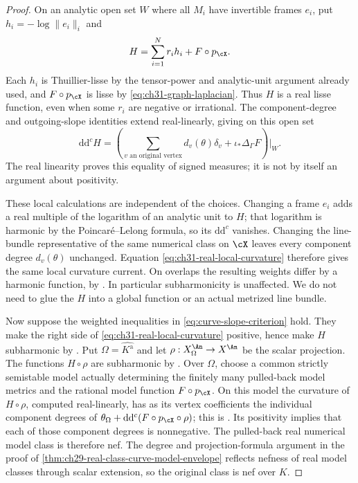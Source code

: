 \begin{proof}
On an analytic open set \(W\) where all \(M_i\) have invertible frames \(e_i\),
put \(h_i=-\log\lVert e_i\rVert_i\) and
\[
                  H=\sum_{i=1}^N r_i h_i+F\circ p_{\cX}.
\]
Each \(h_i\) is Thuillier-lisse by the tensor-power and analytic-unit
argument already used, and \(F\circ p_{\cX}\) is lisse by
\eqref{eq:ch31-graph-laplacian}.  Thus \(H\) is a real lisse function,
even when some \(r_i\) are negative or irrational.
The component-degree and outgoing-slope identities extend
real-linearly, giving on this open set
\begin{equation}
\label{eq:ch31-real-local-curvature}
 \mathrm d\mathrm d^cH
  =\left(\sum_{v\text{ an original vertex}}
                 d_v(\theta)\delta_v
                       +\iota_*\Delta_\Gamma F\right)\bigg|_W.
\end{equation}
The real linearity proves this equality of signed measures;
it is not by itself an argument about positivity.

These local calculations are independent of the choices.
Changing a frame \(e_i\) adds a real multiple of the logarithm
of an analytic unit to \(H\); that logarithm is harmonic by the
Poincar\'e--Lelong formula, so its
\(\mathrm d\mathrm d^c\) vanishes.
Changing the line-bundle representative of the same numerical class
on \(\cX\) leaves every component degree \(d_v(\theta)\) unchanged.
Equation \eqref{eq:ch31-real-local-curvature} therefore gives the
same local curvature current.  On overlaps the resulting weights
differ by a harmonic function, by \cite[Lemma~3.3.12]{Thu05}.
In particular subharmonicity is unaffected.  We do not need to
glue the \(H\) into a global function or an actual metrized line bundle.

Now suppose the weighted inequalities in
\eqref{eq:curve-slope-criterion} hold.  They make the right side of
\eqref{eq:ch31-real-local-curvature} positive, hence make \(H\)
subharmonic by \cite[Theorem~3.4.12(ii)]{Thu05}.
Put \(\Omega=\widehat{K^{\mathrm a}}\) and let
\(\rho:X_\Omega^{\An}\to X^{\An}\) be the scalar projection.
The functions \(H\circ\rho\) are subharmonic by
\cite[Corollary~3.4.5]{Thu05}.
Over \(\Omega\), choose a common strictly semistable model actually
determining the finitely many pulled-back model metrics and the
rational model function \(F\circ p_{\cX}\).
On this model the curvature of \(H\circ\rho\), computed real-linearly,
has as its vertex coefficients the individual component degrees of
\(\theta_\Omega+\mathrm d\mathrm d^c(F\circ p_{\cX}\circ\rho)\);
this is \cite[Proposition~3.7]{GJKM19}.
Its positivity implies that each of those component degrees is
nonnegative.  The pulled-back real numerical model class is therefore
nef.  The degree and projection-formula argument in the proof of
\cref{thm:ch29-real-class-curve-model-envelope} reflects nefness
of real model classes through scalar extension, so the original
class is nef over \(K\).


\end{proof}
